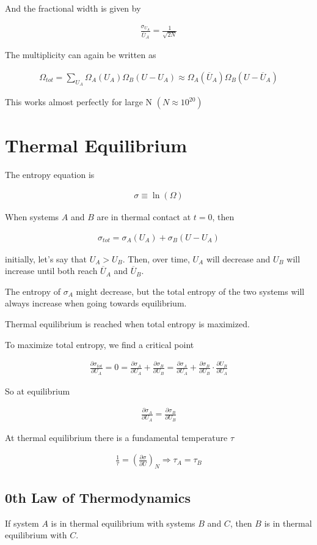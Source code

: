 \documentclass[fleqn]{report}
\newcommand{\del}{\partial}
\newcommand{\equations} [1] {
\begin{gather*}
#1
\end{gather*}
}
\begin{document}
And the fractional width is given by 
\equations{
    \frac{\sigma_{U_A}}{\overline U_A}
    =
    \frac{1}{\sqrt{2N}}
}

The multiplicity can again be written as 
\equations{
    \Omega_{tot}
    =
    \sum_{U_{A}}
    \Omega_A(U_A)
    \Omega_B(U - U_A)
    \approx 
    \Omega_A(\overline U_A)
    \Omega_B(U - \overline U_A)
}

This works almost perfectly for large N $(N \approx 10^{20})$

\section{Thermal Equilibrium}
The entropy equation is 
\equations{
    \sigma 
    \equiv 
    \ln(\Omega)
}

When systems $A$ and $B$ are in thermal contact at $t=0$, then 
\equations{
    \sigma_{tot}
    =
    \sigma_A(U_A)
    +
    \sigma_B(U - U_A)
}

initially, let's say that $U_A > U_B$.
Then, over time, $U_A$ will decrease and $U_B$ will increase until both 
reach $\overline U_A$ and $\overline U_B$.

The entropy of $\sigma_A$ might decrease, but the total entropy 
of the two systems will always increase when going towards equilibrium. 

Thermal equilibrium is reached when total entropy is maximized. 

To maximize total entropy, we find a critical point 
\equations{
    \frac{\del \sigma_{tot}}{\del U_A}
    =
    0
    =
    \frac{\del \sigma_{A}}{\del U_A}
    +
    \frac{\del \sigma_{B}}{\del U_B}
    =
    \frac{\del \sigma_{A}}{\del U_A}
    +
    \frac{\del \sigma_{B}}{\del U_B}
    \cdot
    \frac{\del U_B}{\del U_A}
}

So at equilibrium 
\equations{
    \frac{\del \sigma_A}{\del U_A}
    =
    \frac{\del \sigma_{B}}{\del U_B}
}

At thermal equilibrium there is a fundamental temperature $\tau$ 
\equations{
    \frac{1}{\tau}
    =
    \left(
        \frac{\del \sigma}{\del U}
    \right)_N
    \Rightarrow 
    \tau_A 
    =
    \tau_B
}

\subsection{0th Law of Thermodynamics}
If system $A$ is in thermal equilibrium with systems $B$ and $C$, then 
$B$ is in thermal equilibrium with $C$.
\end{document}
